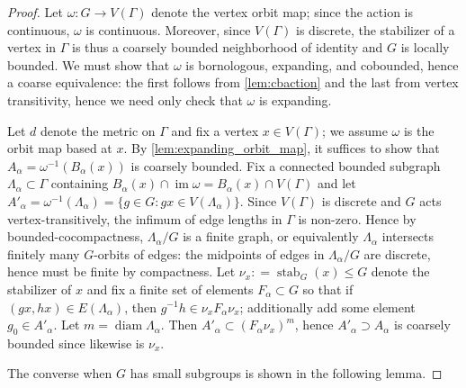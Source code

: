 \documentclass[10pt,a4paper]{amsart}
\DeclareMathOperator{\diam}{diam}
\DeclareMathOperator{\img}{im}
\DeclareMathOperator{\stab}{stab}
\newcommand{\dfn}{\mathrel{\mathop:}=}
\begin{document}
\begin{proof}
  Let $\omega : G \to V(\Gamma)$ denote the vertex orbit map; since
  the action is continuous, $\omega$ is continuous.  
  Moreover, since $V(\Gamma)$ is discrete, the stabilizer of a vertex in $\Gamma$ is thus a coarsely
  bounded neighborhood of identity and $G$ is locally bounded.  We
  must show that $\omega$ is bornologous, expanding, and cobounded,
  hence a coarse equivalence: 
  the first follows from \cref{lem:cbaction} and the last from
  vertex transitivity, hence we need only check that $\omega$ is
  expanding. 

  Let $d$ denote the metric on $\Gamma$ and fix a vertex $x \in
  V(\Gamma)$; we assume $\omega$ is the orbit map based at $x$. 
  By \cref{lem:expanding_orbit_map}, 
  it suffices to show that $A_\alpha = \omega^{-1}(B_\alpha(x))$ is coarsely
  bounded.     Fix a connected bounded subgraph $\Lambda_\alpha
  \subset \Gamma$ containing $B_\alpha(x) \cap \img \omega =
  B_{\alpha}(x) \cap V(\Gamma)$ and let $A'_\alpha =
  \omega^{-1}(\Lambda_\alpha) = \{g \in G : gx \in
  V(\Lambda_\alpha)\}$.  Since $V(\Gamma)$ is discrete and $G$ acts
  vertex-transitively, the infimum of edge lengths in $\Gamma$ is
  non-zero. Hence by bounded-cocompactness, $\Lambda_\alpha / G$ is
  a finite graph, 
  or equivalently $\Lambda_\alpha$ intersects finitely many $G$-orbits of
  edges: the midpoints of edges in $\Lambda_\alpha/G$ are discrete, hence
  must be finite by compactness.   Let $\nu_x \dfn \stab_G(x) \leq G$ denote the
  stabilizer of $x$ and fix a finite set of elements $F_\alpha
  \subset G$ so
  that if $(gx,hx) \in E(\Lambda_\alpha)$, then $g^{-1}h \in
  \nu_x F_\alpha \nu_x$;
  additionally add some element $g_0 \in A'_\alpha$.  Let $m = \diam
  \Lambda_\alpha$.  Then $A'_\alpha \subset (F_\alpha \nu_x)^m$,
  hence $A'_\alpha \supset A_\alpha$ 
  is coarsely bounded since likewise is $\nu_x$.

  The converse when $G$ has small subgroups is shown in the
  following lemma.
\end{proof}
\end{document}
